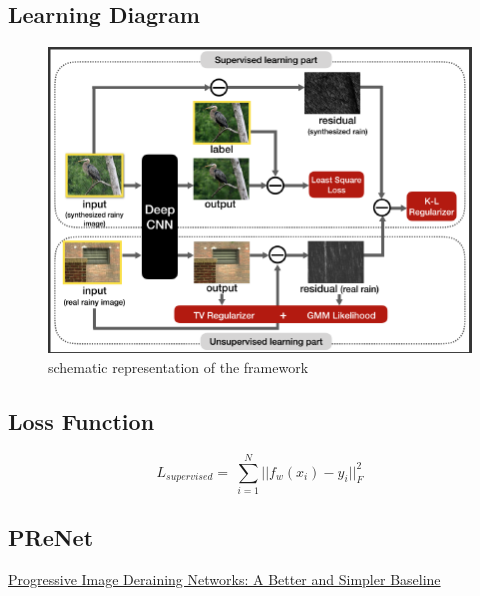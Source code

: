 \documentclass{article}
\begin{document}
\subsection{Learning Diagram}
\begin{figure}[H]
    \centering
    \includegraphics[width=\linewidth]{semi-supervised_SIRR}
    \caption{schematic representation of the framework}
\end{figure}

\subsection{Loss Function}

\begin{equation*}
    L_{supervised}=\    \sum_{i=1}^{N} \vert\vert f_{w}(x_i)-y_i \vert\vert_{F}^{2}
\end{equation*}



\subsection{PReNet}
\href{https://csdwren.github.io/papers/PReNet_cvpr_camera.pdf}{Progressive Image Deraining Networks: A Better and Simpler Baseline}
\end{document}
